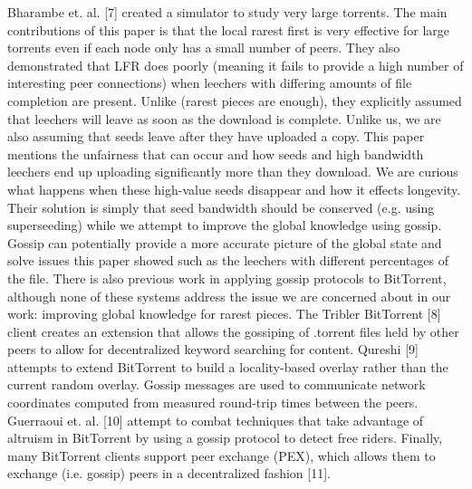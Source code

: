     Bharambe et. al. [7] created a simulator to study very large torrents. The main contributions of this paper is that the local rarest first is very effective for large torrents even if each node only has a small number of peers. They also demonstrated that LFR does poorly (meaning it fails to provide a high number of interesting peer connections) when leechers with differing amounts of file completion are present. Unlike (rarest pieces are enough), they explicitly assumed that leechers will leave as soon as the download is complete. Unlike us, we are also assuming that seeds leave after they have uploaded a copy. This paper mentions the unfairness that can occur and how seeds and high bandwidth leechers end up uploading significantly more than they download. We are curious what happens when these high-value seeds disappear and how it effects longevity. Their solution is simply that seed bandwidth should be conserved (e.g. using superseeding) while we attempt to improve the global knowledge using gossip. Gossip can potentially provide a more accurate picture of the global state and solve issues this paper showed such as the leechers with different percentages of the file.
    There is also previous work in applying gossip protocols to BitTorrent, although none of these systems address the issue we are concerned about in our work: improving global knowledge for rarest pieces. The Tribler BitTorrent [8] client creates an extension that allows the gossiping of .torrent files held by other peers to allow for decentralized keyword searching for content. Qureshi [9] attempts to extend BitTorrent to build a locality-based overlay rather than the current random overlay. Gossip messages are used to communicate network coordinates computed from measured round-trip times between the peers. Guerraoui et. al. [10] attempt to combat techniques that take advantage of altruism in BitTorrent by using a gossip protocol to detect free riders. Finally, many BitTorrent clients support peer exchange (PEX), which allows them to exchange (i.e. gossip) peers in a decentralized fashion [11]. 

